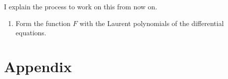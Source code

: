 \documentclass[oneside, a4paper, onecolumn, 11pt]{article}
\begin{document}
I explain the process to  work on this from now on.

\begin{enumerate}[label=Step \arabic*:]
    \item Form the function \(F\) with the Laurent polynomials of the differential equations.
\end{enumerate}

\newpage



\newpage
\appendix

\section{Appendix}
\label{sec:appendix}
\end{document}
